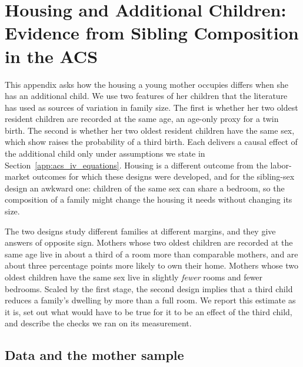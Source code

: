 \providecommand{\acsivfigdir}{../../output/acs_fertility_iv/data_appendix/figures}
\providecommand{\acsivtabdir}{../../output/acs_fertility_iv/data_appendix/tables}

\section{Housing and Additional Children: Evidence from Sibling Composition in the ACS}
\label{app:acs_iv}

This appendix asks how the housing a young mother occupies differs when she has
an additional child. We use two features of her children that the literature has
used as sources of variation in family size. The first is whether her two oldest
resident children are recorded at the same age, an age-only proxy for a twin
birth. The second is whether her two oldest resident children have the same sex,
which \citet{angrist1998children} show raises the probability of a third birth.
Each delivers a causal effect of the additional child only under assumptions we
state in Section~\ref{app:acs_iv_equations}. Housing is a different outcome from
the labor-market outcomes for which these designs were developed, and for the
sibling-sex design an awkward one: children of the same sex can share a bedroom,
so the composition of a family might change the housing it needs without changing
its size.

The two designs study different families at different margins, and they give
answers of opposite sign. Mothers whose two oldest children are recorded at the
same age live in about a third of a room more than comparable mothers, and are
about three percentage points more likely to own their home. Mothers whose two
oldest children have the same sex live in slightly \emph{fewer} rooms and fewer
bedrooms. Scaled by the first stage, the second design implies that a third child
reduces a family's dwelling by more than a full room. We report this estimate as
it is, set out what would have to be true for it to be an effect of the third
child, and describe the checks we ran on its measurement.

\subsection{Data and the mother sample}
\label{app:acs_iv_data}

